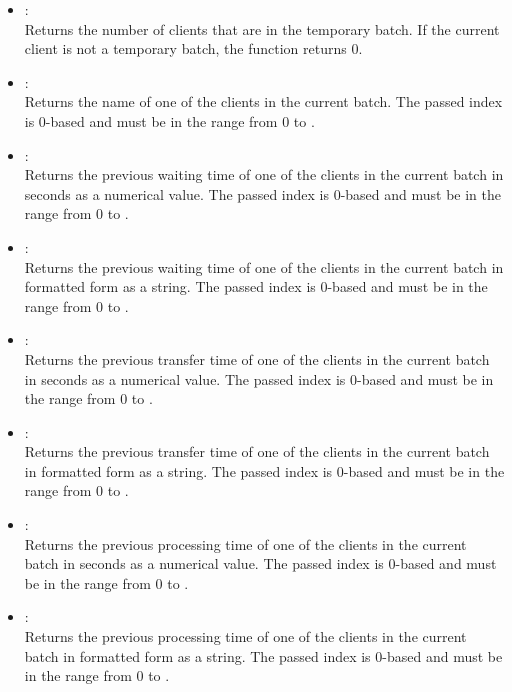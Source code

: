 \begin{itemize}
\item
{}:\\
Returns the number of clients that are in the temporary batch.  
If the current client is not a temporary batch, the function returns 0.

\item
{}:\\
Returns the name of one of the clients in the current batch.
The passed index is 0-based and must be in the range from 0 to .

\item
{}:\\
Returns the previous waiting time of one of the clients in the current batch in seconds as a numerical value.
The passed index is 0-based and must be in the range from 0 to .

\item
{}:\\
Returns the previous waiting time of one of the clients in the current batch in formatted form as a string.
The passed index is 0-based and must be in the range from 0 to .

\item
{}:\\
Returns the previous transfer time of one of the clients in the current batch in seconds as a numerical value.
The passed index is 0-based and must be in the range from 0 to .

\item
{}:\\
Returns the previous transfer time of one of the clients in the current batch in formatted form as a string.
The passed index is 0-based and must be in the range from 0 to .

\item
{}:\\
Returns the previous processing time of one of the clients in the current batch in seconds as a numerical value.
The passed index is 0-based and must be in the range from 0 to .

\item
{}:\\
Returns the previous processing time of one of the clients in the current batch in formatted form as a string.
The passed index is 0-based and must be in the range from 0 to .
	 

\end{itemize}
